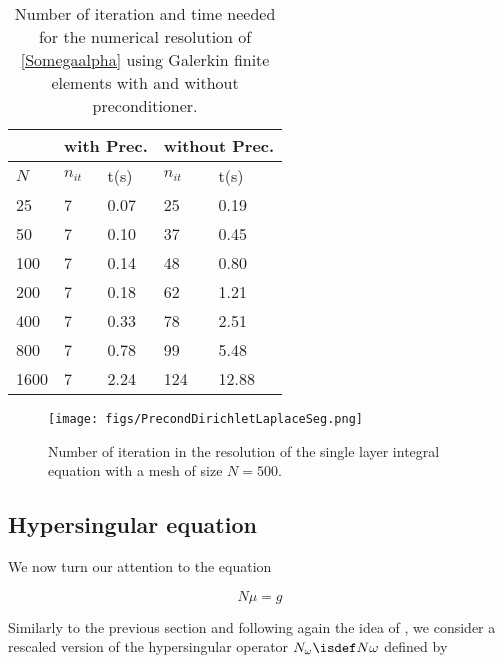 \documentclass[a4paper]{article}
\begin{document}
		\begin{table}
		\begin{center}
			\begin{tabular}{|| m{4em} | m{4em} | m{4em} | m{4em} | m{4em}||} 
				\hline
				\multicolumn{1}{||c|}{ }&
				\multicolumn{2}{c|}{with Prec.}&\multicolumn{2}{c||}{without Prec.}\\
				\hline
				$N$ & $n_{it}$& t(s) & $n_{it}$ & t(s)\\
				\hline\hline
				25 & 7 & 0.07 & 25 & 0.19\\ 
				\hline
				50 & 7 & 0.10 & 37 & 0.45\\
				\hline
				100 & 7 & 0.14 & 48 & 0.80\\
				\hline
				200 & 7 & 0.18 & 62 & 1.21\\
				\hline
				400 & 7 & 0.33 & 78 & 2.51\\
				\hline
				800 & 7 & 0.78 & 99 & 5.48\\
				\hline
				1600 & 7 & 2.24 & 124 & 12.88\\
				\hline
			\end{tabular}
		\end{center}
		\caption{Number of iteration and time needed for the numerical resolution of \eqref{Somegaalpha} using Galerkin finite elements with and without preconditioner.}
		\label{TableNitTimeLaplaceDirichlet}
	\end{table}
	
	
	
	
	\begin{figure}
		\centering
		\texttt{[image: figs/PrecondDirichletLaplaceSeg.png]}
		\caption{Number of iteration in the resolution of the single layer integral equation with a mesh of size $N = 500$.}
		\label{FigureNitLaplaceDirichlet}
	\end{figure}
	
	\subsection{Hypersingular equation} 
	
	We now turn our attention to the equation 
	
	\begin{equation}
	N\mu = g
	\label{Nmu}
	\end{equation} 
	
	Similarly to the previous section and following again the idea of \cite{bruno2012second}, we consider a rescaled version of the hypersingular operator $N_\omega \isdef N \omega$ defined by
	
\end{document}
